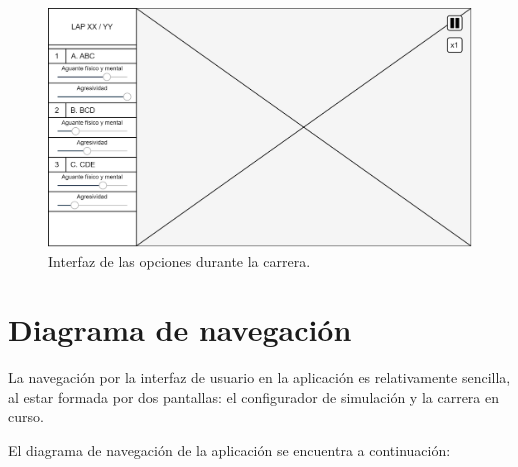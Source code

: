 \begin{figure}[H]
    \centering
    \includegraphics[width=\textwidth]{imagenes/pag2.png}
    \caption{Interfaz de las opciones durante la carrera.}
\end{figure}

\section{Diagrama de navegación}

La navegación por la interfaz de usuario en la aplicación es relativamente sencilla, al estar formada por dos pantallas: el configurador de simulación y la carrera en curso.

\bigskip
\newpage
El diagrama de navegación de la aplicación se encuentra a continuación:

